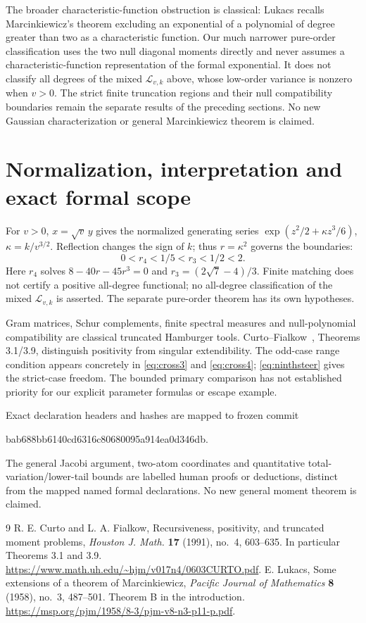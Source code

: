 \documentclass[11pt]{article}
\begin{document}
The broader characteristic-function obstruction is classical:
Lukacs \cite[Theorem B, printed page 487]{Lukacs} recalls
Marcinkiewicz's theorem excluding an exponential of a polynomial of
degree greater than two as a characteristic function. Our much
narrower pure-order classification uses the two null diagonal
moments directly and never assumes a characteristic-function
representation of the formal exponential. It does not classify
all degrees of the mixed $\mathcal L_{v,k}$ above, whose low-order
variance is nonzero when $v>0$. The strict finite truncation regions
and their null compatibility boundaries remain the separate results
of the preceding sections. No new Gaussian characterization or
general Marcinkiewicz theorem is claimed.

\section{Normalization, interpretation and exact formal scope}
For $v>0$, $x=\sqrt v\,y$ gives the normalized generating series
$\exp(z^2/2+\kappa z^3/6)$, $\kappa=k/v^{3/2}$. Reflection changes
the sign of $k$; thus $r=\kappa^2$ governs the boundaries:
\[
 0<r_4<1/5<r_3<1/2<2.
\]
Here $r_4$ solves $8-40r-45r^3=0$ and
$r_3=(2\sqrt7-4)/3$. Finite matching does not certify a positive
all-degree functional; no all-degree classification of the mixed $\mathcal L_{v,k}$ is asserted. The separate pure-order theorem has its own hypotheses.

Gram matrices, Schur complements, finite spectral measures and
null-polynomial compatibility are classical truncated Hamburger
tools. Curto--Fialkow~\cite{curtofialkow}, Theorems 3.1/3.9,
distinguish positivity from singular extendibility. The odd-case
range condition appears concretely in \eqref{eq:cross3} and
\eqref{eq:cross4}; \eqref{eq:ninthsteer} gives the strict-case freedom.
The bounded primary comparison has not established priority for
our explicit parameter formulas or escape example.

Exact declaration headers and hashes are mapped to frozen commit
\begin{center}\small\ttfamily
bab688bb6140cd6316c80680095a914ea0d346db.
\end{center}
The general Jacobi argument, two-atom coordinates and quantitative
total-variation/lower-tail bounds are labelled human proofs or
deductions, distinct from the mapped named formal declarations.
No new general moment theorem is claimed.

\begin{thebibliography}{9}
 R. E. Curto and L. A. Fialkow,
Recursiveness, positivity, and truncated moment problems,
\emph{Houston J. Math.} \textbf{17} (1991), no.~4,
603--635. In particular Theorems 3.1 and 3.9.
\url{https://www.math.uh.edu/~hjm/v017n4/0603CURTO.pdf}.
 E. Lukacs,
Some extensions of a theorem of Marcinkiewicz,
\emph{Pacific Journal of Mathematics} \textbf{8} (1958), no.~3,
487--501. Theorem B in the introduction.
\url{https://msp.org/pjm/1958/8-3/pjm-v8-n3-p11-p.pdf}.
\end{thebibliography}
\end{document}
